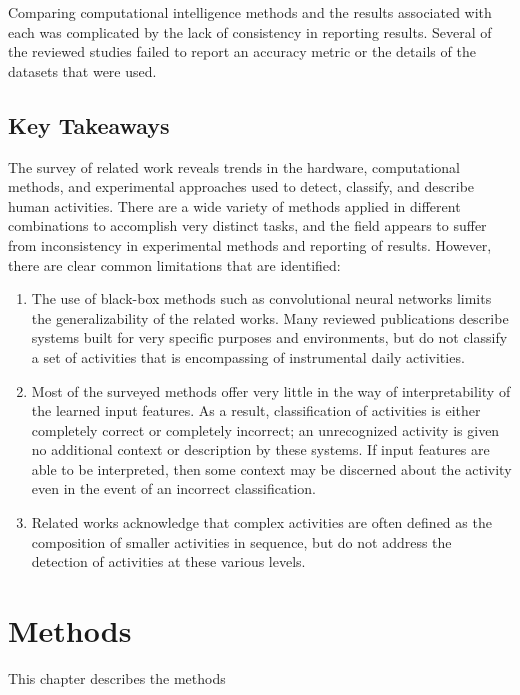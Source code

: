 \documentclass[12pt]{report}
\begin{document}
Comparing computational intelligence methods and the results associated with each was complicated by the lack of consistency in reporting results. Several of the reviewed studies failed to report an accuracy metric or the details of the datasets that were used.

\section{Key Takeaways}
The survey of related work reveals trends in the hardware, computational methods, and experimental approaches used to detect, classify, and describe human activities. There are a wide variety of methods applied in different combinations to accomplish very distinct tasks, and the field appears to suffer from inconsistency in experimental methods and reporting of results. However, there are clear common limitations that are identified:
\begin{enumerate}
    \item The use of black-box methods such as convolutional neural networks limits the generalizability of the related works. Many reviewed publications describe systems built for very specific purposes and environments, but do not classify a set of activities that is encompassing of instrumental daily activities.
    \item Most of the surveyed methods offer very little in the way of interpretability of the learned input features. As a result, classification of activities is either completely correct or completely incorrect; an unrecognized activity is given no additional context or description by these systems. If input features are able to be interpreted, then some context may be discerned about the activity even in the event of an incorrect classification.
    \item Related works acknowledge that complex activities are often defined as the composition of smaller activities in sequence, but do not address the detection of activities at these various levels.
\end{enumerate}

\chapter{Methods}

This chapter describes the methods 
\end{document}
